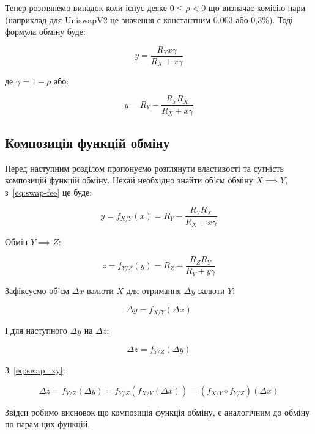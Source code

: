 \documentclass[14pt]{extarticle}
\begin{document}
Тепер розглянемо випадок коли існує деяке $0 \leq \rho < 0$ що визначає комісію пари
(наприклад для UniswapV2 це значення є константним $0.003$ або 0,3\%). Тоді
формула обміну буде:

\begin{equation*}
	y = \frac{R_{Y} x \gamma}{R_{X} + x \gamma}
\end{equation*}

де $\gamma = 1 - \rho$ або:

\begin{equation}\label{eq:swap-fee}
	y = R_{Y} - \frac{R_{Y} R_{X}}{R_{X} + x \gamma}
\end{equation}

\subsection{Композиція функцій обміну}

Перед наступним розділом пропонуємо розглянути властивості та сутність
композицій функцій обміну. Нехай необхідно знайти об'єм обміну \(X \implies Y\),
з~\eqref{eq:swap-fee} це буде:

\begin{equation*}
	y = f_{X/Y}(x) = R_{Y} - \frac{R_{Y} R_{X}}{R_{X} + x \gamma}
\end{equation*}

Обмін \(Y \implies Z\):

\begin{equation*}
	z = f_{Y/Z}(y) = R_{Z} - \frac{R_{Z} R_{Y}}{R_{Y} + y \gamma}
\end{equation*}

Зафіксуємо об'єм $\Delta x$ валюти $X$ для отримання $\Delta y$ валюти $Y$:

\begin{equation}\label{eq:swap_xy}
	\Delta y = f_{X/Y}(\Delta x)
\end{equation}

І для наступного $\Delta y$ на $\Delta z$:

\begin{equation*}
	\Delta z = f_{Y/Z}(\Delta y)
\end{equation*}

З~\eqref{eq:swap_xy}:

\begin{equation*}
	\Delta z = f_{Y/Z}(\Delta y) = f_{Y/Z}(f_{X/Y}(\Delta x)) = (f_{X/Y} \circ f_{Y/Z})(\Delta x)
\end{equation*}

Звідси робимо висновок що композиція функція обміну, є аналогічним до обміну по
парам цих функцій.
\end{document}
